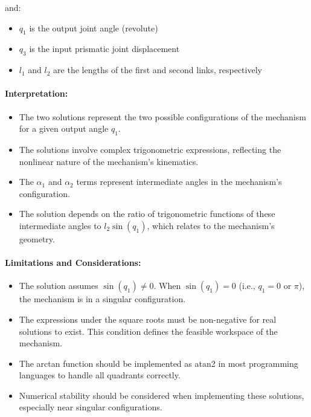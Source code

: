 \begin{solution}
and:
\begin{itemize}
    \item $q_1$ is the output joint angle (revolute)
    \item $q_3$ is the input prismatic joint displacement
    \item $l_1$ and $l_2$ are the lengths of the first and second links, respectively
\end{itemize}

\paragraph{Interpretation:}
\begin{itemize}
    \item The two solutions represent the two possible configurations of the mechanism for a given output angle $q_1$.
    \item The solutions involve complex trigonometric expressions, reflecting the nonlinear nature of the mechanism's kinematics.
    \item The $\alpha_1$ and $\alpha_2$ terms represent intermediate angles in the mechanism's configuration.
    \item The solution depends on the ratio of trigonometric functions of these intermediate angles to $l_2 \sin(q_1)$, which relates to the mechanism's geometry.
\end{itemize}

\paragraph{Limitations and Considerations:}
\begin{itemize}
    \item The solution assumes $\sin(q_1) \neq 0$. When $\sin(q_1) = 0$ (i.e., $q_1 = 0$ or $\pi$), the mechanism is in a singular configuration.
    \item The expressions under the square roots must be non-negative for real solutions to exist. This condition defines the feasible workspace of the mechanism.
    \item The arctan function should be implemented as atan2 in most programming languages to handle all quadrants correctly.
    \item Numerical stability should be considered when implementing these solutions, especially near singular configurations.
\end{itemize}



\end{solution}

